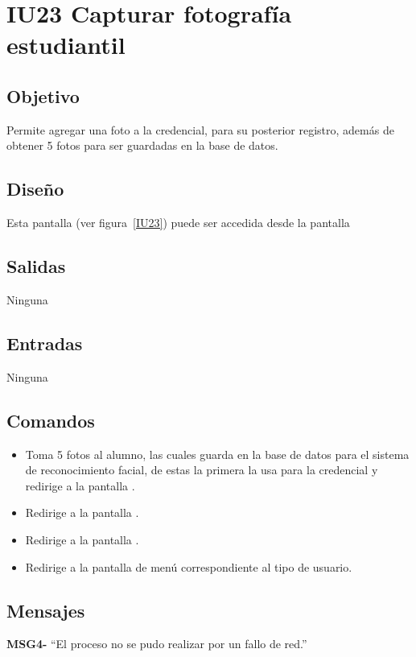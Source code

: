 
\section{IU23 Capturar fotografía estudiantil}

\subsection{Objetivo}
   Permite agregar una foto a la credencial, para su posterior registro, además de obtener 5 fotos para ser guardadas en la base de datos.
\subsection{Diseño}
    Esta pantalla  (ver figura~\ref{IU23}) puede ser accedida desde la pantalla 


\subsection{Salidas}
Ninguna
\subsection{Entradas}
Ninguna
\subsection{Comandos}
\begin{itemize}
\item {} Toma 5 fotos al alumno, las cuales guarda en la base de datos para el sistema de reconocimiento facial, de estas la primera la usa para la credencial y redirige a la pantalla .
    \item {} Redirige a la pantalla .
    \item {} Redirige a la pantalla .
    \item {} Redirige a la pantalla de menú correspondiente al tipo de usuario.
    
\end{itemize}

\subsection{Mensajes}

\begin{Citemize}
    \item {\bf MSG4-}  ``El proceso no se pudo realizar por un fallo de red.''
\end{Citemize}

